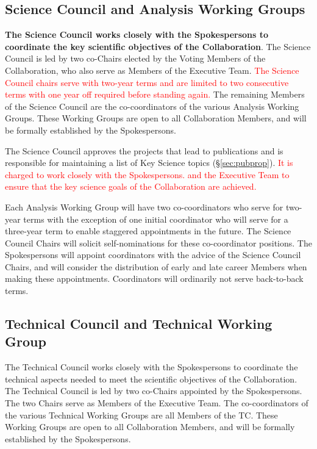 \documentclass[12pt]{article}
\newcommand{\exec}{{Executive Team}}
\begin{document}
\subsection{Science Council and Analysis Working Groups}
\label{sec:SC}

\textbf{The Science Council works closely with the Spokespersons to coordinate the key scientific objectives of the Collaboration}.  The Science Council is led by two co-Chairs elected by the Voting Members of the Collaboration, who also serve as Members of the \exec.   \textcolor{red}{The Science Council chairs serve with two-year terms and are limited to two consecutive terms with one year off required before standing again.}
The remaining Members of the Science Council are the co-coordinators of the various Analysis Working Groups. These Working Groups are open to all Collaboration Members, and will be formally established by the Spokespersons.  

The Science Council approves the projects that lead to publications and is responsible for maintaining a list of Key Science topics  (\S\ref{sec:pubprop}). \textcolor{red}{It is charged to work closely with the Spokespersons. and the Executive Team to ensure that the key science goals of the Collaboration are achieved.} 

Each Analysis Working Group will have two co-coordinators who  serve for two-year terms with the exception of one initial coordinator who will serve for a three-year term to enable staggered appointments in the future.  The Science Council Chairs will solicit self-nominations for these co-coordinator positions. The Spokespersons will appoint coordinators with the advice of the Science Council Chairs, and will consider the distribution of early and late career Members when making these appointments. Coordinators will ordinarily not serve back-to-back terms.


\subsection{Technical Council and Technical Working Group}
The Technical Council works closely with the Spokespersons to coordinate the technical aspects needed to meet the scientific objectives of the Collaboration.  The Technical Council is led by two co-Chairs appointed by the Spokespersons.  The two Chairs serve as Members of the \exec.   The co-coordinators of the various Technical Working Groups are all Members of the TC.   These Working Groups are open to all Collaboration Members, and will be formally established by the Spokespersons.   
\end{document}
